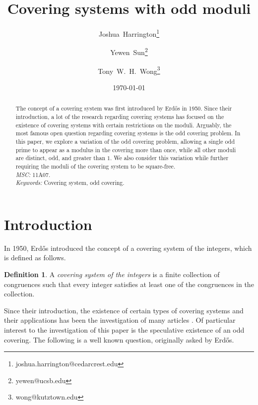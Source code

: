 \documentclass[12pt]{article}
\theoremstyle{definition}
\newtheorem{definition}[theorem]{Definition}
\begin{document}
\title{Covering systems with odd moduli}
\author[1]{Joshua~Harrington\thanks{joshua.harrington@cedarcrest.edu}}
\author[2]{Yewen~Sun\thanks{yewen@ucsb.edu}}
\author[3]{Tony~W.~H.~Wong\thanks{wong@kutztown.edu}}
\date{\today}

\maketitle


\begin{abstract}
The concept of a covering system was first introduced by Erd\H{o}s in 1950.  Since their introduction, a lot of the research regarding covering systems has focused on the existence of covering systems with certain restrictions on the moduli.  Arguably, the most famous open question regarding covering systems is the odd covering problem.  In this paper, we explore a variation of the odd covering problem, allowing a single odd prime to appear as a modulus in the covering more than once, while all other moduli are distinct, odd, and greater than $1$.  We also consider this variation while further requiring the moduli of the covering system to be square-free.\\
\textit{MSC:} 11A07.\\
\textit{Keywords:} Covering system, odd covering.
\end{abstract}

\section{Introduction}\label{sec:intro}
In 1950, Erd\H{o}s \cite{erdos} introduced the concept of a covering system of the integers, which is defined as follows.

\begin{definition}
A \emph{covering system of the integers} is a finite collection of congruences such that every integer satisfies at least one of the congruences in the collection.
\end{definition}

Since their introduction, the existence of certain types of covering systems and their applications has been the investigation of many articles \cite{ffk2008,ffk,ffkpy,filharr,fh,fj,hough,jw,n,o}.  Of particular interest to the investigation of this paper is the speculative existence of an odd covering.  The following is a well known question, originally asked by Erd\H{o}s.
\end{document}
